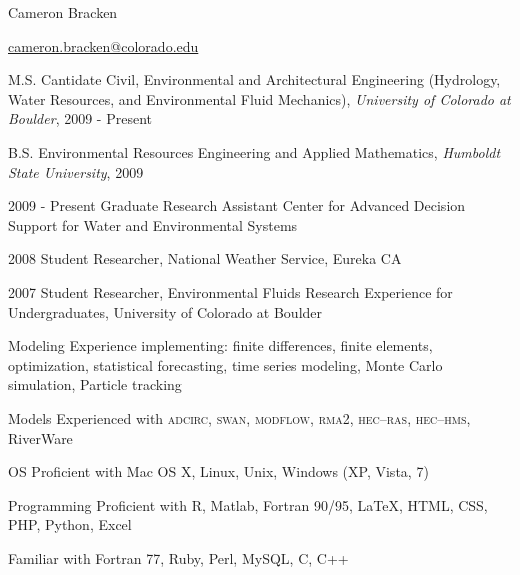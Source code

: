 \documentclass[10pt,a4paper]{scrartcl}
\begin{document}
    \begin{cv}{}
        \begin{cvlist}{}\label{info}  
            \item   Cameron Bracken
            \item   \url{cameron.bracken@colorado.edu}
        \end{cvlist}
        
        \begin{cvlist}{}\label{edu}
            \item[M.S. Cantidate]   { Civil, Environmental and Architectural Engineering (Hydrology, Water Resources, and Environmental Fluid Mechanics)}, {\it University of Colorado at Boulder}, 2009 - Present 
            \item[B.S.]   { Environmental Resources Engineering and Applied Mathematics}, {\it Humboldt State University}, 2009
        \end{cvlist}
        
        \begin{cvlist}{}\label{exp}
            {\setlength{\itemsep}{1pt}
            \setlength{\parskip}{0pt}
            \setlength{\parsep}{0pt}
            
            \item[2009 - Present] Graduate Research Assistant Center for Advanced Decision Support for Water and Environmental Systems
            }
            \item[2008] Student Researcher, National Weather Service, Eureka CA
            \item[2007] Student Researcher, Environmental Fluids Research Experience for Undergraduates, University of Colorado at Boulder
        \end{cvlist}
        
        \begin{cvlist}{}\label{skills}
            \item[Modeling] Experience implementing: finite differences, finite elements, optimization, statistical forecasting, time series modeling, Monte Carlo simulation, Particle tracking
            \item[Models] Experienced with \textsc{adcirc}, \textsc{swan}, \textsc{modflow}, \textsc{rma2}, \textsc{hec--ras}, \textsc{hec--hms}, RiverWare
            \item[OS] Proficient with Mac OS X, Linux, Unix, Windows (XP, Vista, 7)
            \item[Programming] Proficient with R, Matlab, Fortran 90/95, \LaTeX, HTML, CSS, PHP, Python, Excel
            \item Familiar with Fortran 77, Ruby, Perl, MySQL, C, C++
        \end{cvlist}
        

\end{cv}
\end{document}
